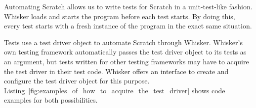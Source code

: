 
Automating Scratch allows us to write tests for Scratch in a unit-test-like fashion.
Whisker loads and starts the program before each test starts.
By doing this, every test starts with a fresh instance of the program in the exact same situation.
\parspace

Tests use a test driver object to automate Scratch through Whisker.
Whisker's own testing framework automatically passes the test driver object to its tests as an argument,
but tests written for other testing frameworks may have to acquire the test driver in their test code.
Whisker offers an interface to create and configure the test driver object for this purpose.
Listing~\ref{fig:examples_of_how_to_acquire_the_test_driver} shows code examples for both possibilities.
\parspace

